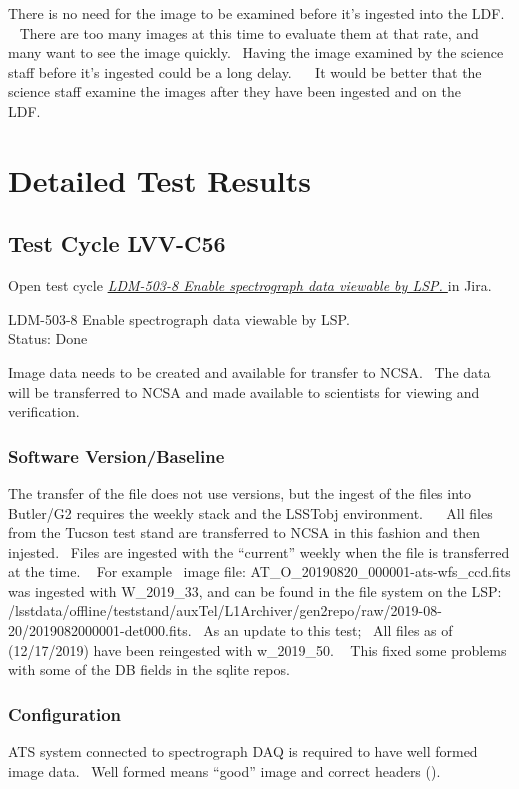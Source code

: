 \documentclass[DM,STR,toc]{lsstdoc}
\begin{document}
There is no need for the image to be examined before it's ingested into
the LDF. ~ There are too many images at this time to evaluate them at
that rate, and many want to see the image quickly. ~Having the image
examined by the science staff before it's ingested could be a long
delay. ~ ~It would be better that the science staff examine the images
after they have been ingested and on the LDF.~~


\newpage
\section{Detailed Test Results}
\label{sect:detailedtestresults}

\subsection{Test Cycle LVV-C56 }

Open test cycle {\it \href{https://jira.lsstcorp.org/secure/Tests.jspa#/testrun/LVV-C56}{LDM-503-8 Enable spectrograph data viewable by LSP.
}} in Jira.

LDM-503-8 Enable spectrograph data viewable by LSP.
\\
Status: Done

Image data needs to be created and available for transfer to NCSA. ~The
data will be transferred to NCSA and made available to scientists for
viewing and verification.~ ~~


\subsubsection{Software Version/Baseline}
The transfer of the file does not use versions, but the ingest of the
files into Butler/G2 requires the weekly stack and the LSSTobj
environment. ~ ~All files from the Tucson test stand are transferred to
NCSA in this fashion and then injested. ~Files are ingested with the
``current'' weekly when the file is transferred at the time. ~ For
example ~image file: AT\_O\_20190820\_000001-ats-wfs\_ccd.fits was
ingested with W\_2019\_33, and can be found in the file system on the
LSP:
/lsstdata/offline/teststand/auxTel/L1Archiver/gen2repo/raw/2019-08-20/2019082000001-det000.fits.
~As an update to this test; ~All files as of (12/17/2019) have been
reingested with w\_2019\_50. ~ This fixed some problems with some of the
DB fields in the sqlite repos.~ ~


\subsubsection{Configuration}
ATS system connected to spectrograph DAQ is required to have well formed
image data. ~Well formed means ``good'' image and correct headers
(). ~\\[2\baselineskip]
\end{document}
